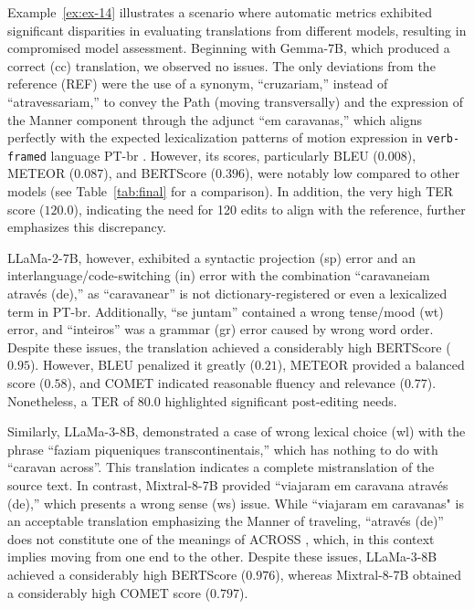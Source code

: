 Example~\ref{ex:ex-14} illustrates a scenario where automatic metrics exhibited significant disparities in evaluating translations from different models, resulting in compromised model assessment. Beginning with Gemma-7B, which produced a correct (cc) translation, we observed no issues. The only deviations from the reference (REF) were the use of a synonym, ``cruzariam,'' instead of ``atravessariam,'' to convey the Path (moving transversally) and the expression of the Manner component through the adjunct ``em caravanas,'' which aligns perfectly with the expected lexicalization patterns of motion expression in \texttt{verb-framed} language PT-br \parencite{talmy1985lexicalization, talmy2000towardb, slobin2005relating, oliveira2022expressing}. However, its scores, particularly BLEU ($0.008$), METEOR ($0.087$), and BERTScore ($0.396$), were notably low compared to other models (see Table~\ref{tab:final} for a comparison). In addition, the very high TER score ($120.0$), indicating the need for 120 edits to align with the reference, further emphasizes this discrepancy.

LLaMa-2-7B, however, exhibited a syntactic projection (sp) error and an interlanguage/code-switching (in) error with the combination ``caravaneiam através (de),'' as ``caravanear'' is not dictionary-registered or even a lexicalized term in PT-br. Additionally, ``se juntam'' contained a wrong tense/mood (wt) error, and ``inteiros'' was a grammar (gr) error caused by wrong word order. Despite these issues, the translation achieved a considerably high BERTScore ($0.95$). However, BLEU penalized it greatly ($0.21$), METEOR provided a balanced score ($0.58$), and COMET indicated reasonable fluency and relevance ($0.77$). Nonetheless, a TER of $80.0$ highlighted significant post-editing needs.

Similarly, LLaMa-3-8B, demonstrated a case of wrong lexical choice (wl) with the phrase ``faziam piqueniques transcontinentais,'' which has nothing to do with ``caravan across''. This translation indicates a complete mistranslation of the source text. In contrast, Mixtral-8-7B provided ``viajaram em caravana através (de),'' which presents a wrong sense (ws) issue. While ``viajaram em caravanas" is an acceptable translation emphasizing the Manner of traveling, ``através (de)'' does not constitute one of the meanings of ACROSS \parencite{McCleary-Viotti-2004}, which, in this context implies moving from one end to the other. Despite these issues, LLaMa-3-8B achieved a considerably high BERTScore ($0.976$), whereas Mixtral-8-7B obtained a considerably high COMET score ($0.797$).

